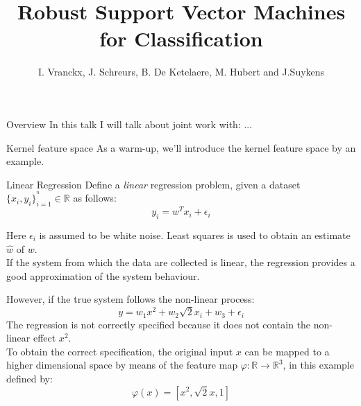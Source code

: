 \documentclass[10pt,]{beamer}
\title{Robust Support Vector Machines for Classification}
\author[statistics]{I. Vranckx, J. Schreurs, B. De Ketelaere, M. Hubert and J.Suykens}
\begin{document}
\ECFAugie

\begin{frame}[plain]
\maketitle  
\end{frame}

\begin{frame}{Overview}
In this talk I will talk about joint work with: ...
\end{frame}


\begin{frame}{Kernel feature space}
As a warm-up, we'll introduce the kernel feature space by an example.
\end{frame}

\begin{frame}{Linear Regression}
Define a \textit{linear} regression problem, given a
dataset $ \{x_{i},y_{i}\}_{i=1}^{^{n}}\in \mathbb{R}$ as follows:
\begin{equation}
	y_{i}=w^{T}x_{i}+\epsilon_{i}
	\label{eq:regression}
\end{equation}

Here $\epsilon_{i}$ is assumed to be white noise. Least squares is used to obtain an estimate $\hat{w}$ of $w$. \\
\vspace{0.5cm}
If the system from which the data are collected is linear, the
regression provides a good approximation of the system behaviour. 
\end{frame}

\begin{frame}
However, if the true system follows the non-linear process:
\begin{equation}
y=w_{1}x^{2}+w_{2}\sqrt{2}x_{i}+w_{3}+\epsilon_{i}
\end{equation}
The regression is not correctly specified because it does not contain
the non-linear effect $x^{2}$. \\
\vspace{0.5cm}
To obtain the correct specification, the original input $x$ can be mapped to a higher dimensional space
by means of the feature map $\varphi:\mathbb{R}\rightarrow\mathbb{R}^{3}$, in this example defined by:
\begin{equation}
\varphi(x)=[x^{2},\sqrt{2}x,1]
\end{equation}
\end{frame}
\end{document}
